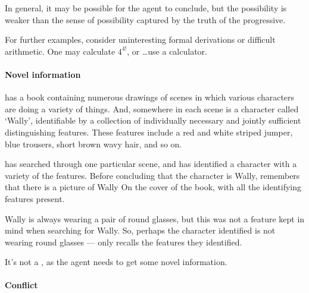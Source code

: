 \begin{note}
  In general, it may be possible for the agent to conclude, but the possibility is weaker than the sense of possibility captured by the truth of the progressive.

  For further examples, consider uninteresting formal derivations or difficult arithmetic.
  One may calculate \(4^{4!}\), or \dots\space use a calculator.
\end{note}

\paragraph*{Novel information}

\begin{note}
  \begin{scenario}
    \label{illu:CS:wheres-wally}
     has a book containing numerous drawings of scenes in which various characters are doing a variety of things.
    And, somewhere in each scene is a character called `Wally', identifiable by a collection of individually necessary and jointly sufficient distinguishing features.
    These features include a red and white striped jumper, blue trousers, short brown wavy hair, and so on.

     has searched through one particular scene, and has identified a character with a variety of the features.
    Before concluding that the character is Wally,  remembers that there is a picture of Wally On the cover of the book, with all the identifying features present.

    Wally is always wearing a pair of round glasses, but this was not a feature  kept in mind when searching for Wally.
    So, perhaps the character  identified is not wearing round glasses  ---  only recalls the features they identified.
  \end{scenario}

  It's not a \fc{}, as the agent needs to get some novel information.
\end{note}

\paragraph*{Conflict}

